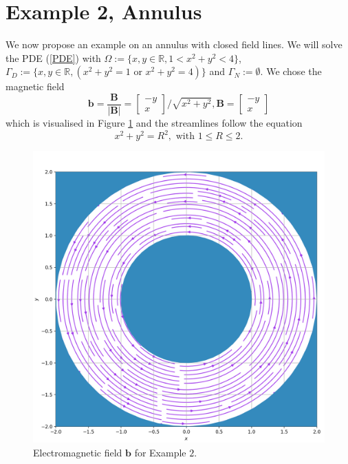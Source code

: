 \documentclass[12pt]{ociamthesis}
\begin{document}
\section{Example 2, Annulus}
We now propose an example on an annulus with closed field lines.
We will solve the PDE (\ref{PDE}) with $\Omega := \{x,y \in \mathbb{R}, 1<x^2+y^2<4\}$, $\Gamma_D := \{x,y \in \mathbb{R}, (x^2+y^2=1 \text{ or } x^2+y^2=4)\}$ and $\Gamma_N := \emptyset$. We chose the magnetic field 
\begin{equation}
\mathbf{b} = \frac{\mathbf{B}}{|\mathbf{B}|} = 
\left[ \begin{matrix}
-y\\
 x
\end{matrix} \right]/\sqrt{x^2+y^2}, 
\mathbf{B} = \left[ \begin{matrix}
-y\\
 x
\end{matrix} \right]
\end{equation}
which is visualised in Figure \ref{E2_VF} and the streamlines follow the equation
\begin{equation}
x^2 + y^2 = R^2, \text{ with } 1\leq R \leq 2.
\end{equation}
\begin{figure}[H]
 \includegraphics[width=\textwidth]{Pics/VectorField/E2b.png}
  \caption{Electromagnetic field $\mathbf{b}$ for Example $2$.}
 \label{E2_VF}
\end{figure}
\end{document}
